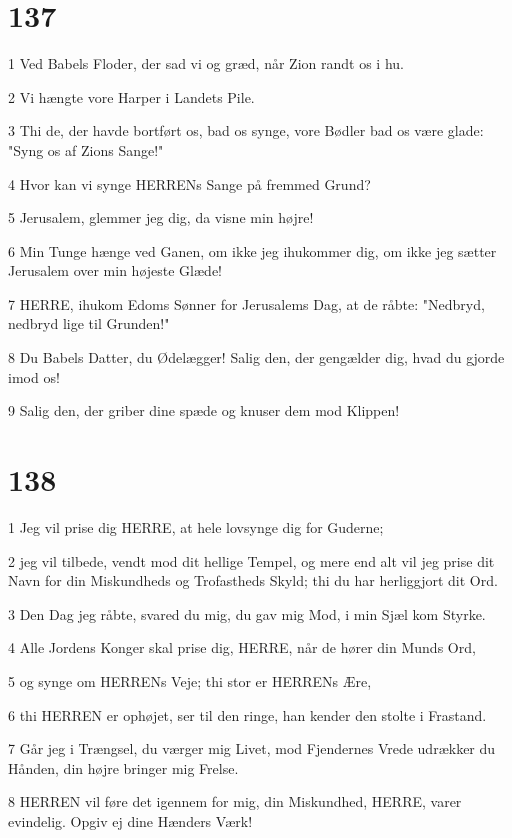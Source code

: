 \chapter{137}

\par 1 Ved Babels Floder, der sad vi og græd, når Zion randt os i hu.
\par 2 Vi hængte vore Harper i Landets Pile.
\par 3 Thi de, der havde bortført os, bad os synge, vore Bødler bad os være glade: "Syng os af Zions Sange!"
\par 4 Hvor kan vi synge HERRENs Sange på fremmed Grund?
\par 5 Jerusalem, glemmer jeg dig, da visne min højre!
\par 6 Min Tunge hænge ved Ganen, om ikke jeg ihukommer dig, om ikke jeg sætter Jerusalem over min højeste Glæde!
\par 7 HERRE, ihukom Edoms Sønner for Jerusalems Dag, at de råbte: "Nedbryd, nedbryd lige til Grunden!"
\par 8 Du Babels Datter, du Ødelægger! Salig den, der gengælder dig, hvad du gjorde imod os!
\par 9 Salig den, der griber dine spæde og knuser dem mod Klippen!

\chapter{138}

\par 1 Jeg vil prise dig HERRE, at hele lovsynge dig for Guderne;
\par 2 jeg vil tilbede, vendt mod dit hellige Tempel, og mere end alt vil jeg prise dit Navn for din Miskundheds og Trofastheds Skyld; thi du har herliggjort dit Ord.
\par 3 Den Dag jeg råbte, svared du mig, du gav mig Mod, i min Sjæl kom Styrke.
\par 4 Alle Jordens Konger skal prise dig, HERRE, når de hører din Munds Ord,
\par 5 og synge om HERRENs Veje; thi stor er HERRENs Ære,
\par 6 thi HERREN er ophøjet, ser til den ringe, han kender den stolte i Frastand.
\par 7 Går jeg i Trængsel, du værger mig Livet, mod Fjendernes Vrede udrækker du Hånden, din højre bringer mig Frelse.
\par 8 HERREN vil føre det igennem for mig, din Miskundhed, HERRE, varer evindelig. Opgiv ej dine Hænders Værk!

